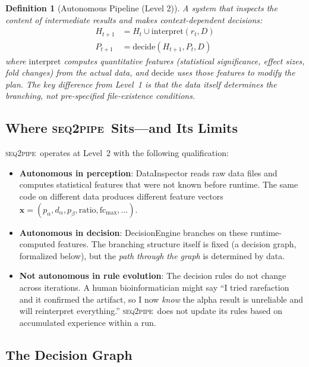 \documentclass[11pt,a4paper]{article}
\newtheorem{definition}{Definition}
\newcommand{\seqpipe}{\textsc{seq2pipe}}
\begin{document}
\begin{definition}[Autonomous Pipeline (Level 2)]
A system that \emph{inspects the content} of intermediate results
and makes context-dependent decisions:
\begin{align}
  H_{t+1} &= H_t \cup \mathrm{interpret}(r_t, D)
  \label{eq:interpret} \\
  P_{t+1} &= \mathrm{decide}(H_{t+1}, P_t, D)
  \label{eq:decide}
\end{align}
where $\mathrm{interpret}$ computes quantitative features
(statistical significance, effect sizes, fold changes) from the
actual data, and $\mathrm{decide}$ uses those features to modify
the plan.
The key difference from Level~1 is that the \emph{data itself}
determines the branching, not pre-specified file-existence
conditions.
\end{definition}

\subsection{Where \seqpipe\ Sits---and Its Limits}

\seqpipe\ operates at Level~2 with the following qualification:

\begin{itemize}
  \item \textbf{Autonomous in perception}: DataInspector reads raw
        data files and computes statistical features that were not
        known before runtime. The same code on different data
        produces different feature vectors
        $\mathbf{x} = (p_\alpha, d_\alpha, p_\beta,
        \mathrm{ratio}, \mathrm{fc}_{\max}, \ldots)$.
  \item \textbf{Autonomous in decision}: DecisionEngine branches on
        these runtime-computed features. The branching structure
        itself is fixed (a decision graph, formalized below), but
        the \emph{path through the graph} is determined by data.
  \item \textbf{Not autonomous in rule evolution}: The decision
        rules do not change across iterations. A human
        bioinformatician might say ``I tried rarefaction and it
        confirmed the artifact, so I now \emph{know} the alpha
        result is unreliable and will reinterpret everything.''
        \seqpipe\ does not update its rules based on accumulated
        experience within a run.
\end{itemize}

\subsection{The Decision Graph}
\end{document}
